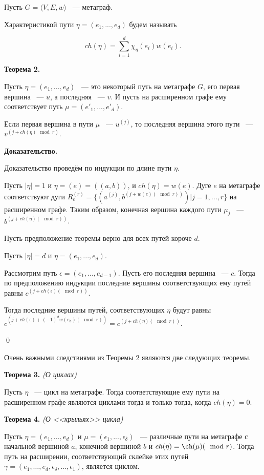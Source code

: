\documentclass[14pt]{mmcs-article}
\begin{document}
Пусть $G = \langle V, E, w \rangle$ ~--- метаграф.

Характеристикой пути $\eta = (e_1, ..., e_d)$ будем называть

\[
    ch(\eta) = \sum_{i = 1}^d \chi_{\eta}(e_i) w(e_i).
\]

\textbf{Теорема 2.}

Пусть  $\eta = (e_1, ..., e_d)$ ~--- это некоторый путь на метаграфе $G$, его первая вершина ~--- $u$, а последняя ~--- $v$. И пусть на расширенном графе ему соответствует путь $\mu = (e'_1, ..., e'_d)$.

Если первая вершина в пути $\mu$ ~--- $u^{(j)}$, то последняя вершина этого пути ~--- $v^{(j + ch(\eta)\mod{r})}$.

\textbf{Доказательство.}

Доказательство проведём по индукции по длине пути $\eta$.

Пусть $|\eta| = 1$ и  $\eta = (e) = ((a,b))$, и $ch(\eta) = w(e)$. Дуге $e$ на метаграфе соответствуют дуги $R^{(r)}_e = \{ (a^{(j)}, b^{(j + w(e) (\mod{r}))} ) | j = 1, ..., r \}$
на расширенном графе. Таким образом, конечная вершина каждого пути $\mu_j$ ~--- $b^{(j + ch(\eta) (\mod{r}))}$.

Пусть предположение теоремы верно для всех путей короче $d$.

Пусть $|\eta| = d$ и $\eta = (e_1, ..., e_d)$.

Рассмотрим путь $\epsilon = (e_1, ..., e_{d-1})$. Пусть его последняя вершина ~--- $c$. Тогда по предположению индукции последние вершины соответствующих ему путей равны $c^{(j + ch(\epsilon) (\mod{r}))}$.

Тогда последние вершины путей, соответствующих $\eta$ будут равны $c^{(j + ch(\epsilon) + (-1)^d w(e_d) (\mod{r}))} = c^{(j + ch(\eta) (\mod{r}))}$.

\qed

Очень важными следствиями из Теоремы 2 являются две следующих теоремы.

\textbf{Теорема 3.} \textsl{(О циклах)}

Пусть $\eta$ ~--- цикл на метаграфе. Тогда соответствующие ему пути на расширенном графе являются циклами тогда и только тогда, когда $ch(\eta) = 0$.

\textbf{Теорема 4.} \textsl{(О <<крыльях>> цикла)}

Пусть $\eta = (e_1, ..., e_d)$ и $\mu = (\epsilon_1, ..., \epsilon_{\delta})$ ~--- различные пути на метаграфе с начальной вершиной $a$, конечной вершиной $b$ и $ch(\eta) = \ch(\mu) (\mod{r})$. Тогда путь на расширении, соответствующий склейке этих путей $\gamma = (e_1, \dots, e_d, \epsilon_{\delta}, \dots, \epsilon_1)$, является циклом.
\end{document}
